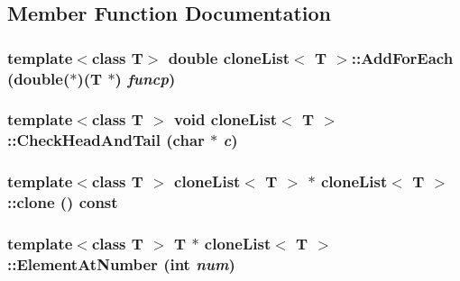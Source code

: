 \subsection{Member Function Documentation}
\hypertarget{classclone_list_a6bc26e4ddd491562d7349b0c4f7cf445}{
\subsubsection[{AddForEach}]{\setlength{\rightskip}{0pt plus 5cm}template$<$class T$>$ double {\bf cloneList}$<$ T $>$::AddForEach (double($\ast$)(T $\ast$) {\em funcp})}}
\label{classclone_list_a6bc26e4ddd491562d7349b0c4f7cf445}
\hypertarget{classclone_list_aaa28fe3ad846446120b27a1928dd406b}{
\subsubsection[{CheckHeadAndTail}]{\setlength{\rightskip}{0pt plus 5cm}template$<$class T $>$ void {\bf cloneList}$<$ T $>$::CheckHeadAndTail (char $\ast$ {\em c})}}
\label{classclone_list_aaa28fe3ad846446120b27a1928dd406b}
\hypertarget{classclone_list_ac5e49d0132613e2bc1b5d148e83b22c7}{
\subsubsection[{clone}]{\setlength{\rightskip}{0pt plus 5cm}template$<$class T $>$ {\bf cloneList}$<$ T $>$ $\ast$ {\bf cloneList}$<$ T $>$::clone () const}}
\label{classclone_list_ac5e49d0132613e2bc1b5d148e83b22c7}
\hypertarget{classclone_list_a761c3700fcf12c3f48b3c34d2a0aef7f}{
\subsubsection[{ElementAtNumber}]{\setlength{\rightskip}{0pt plus 5cm}template$<$class T $>$ T $\ast$ {\bf cloneList}$<$ T $>$::ElementAtNumber (int {\em num})}}
